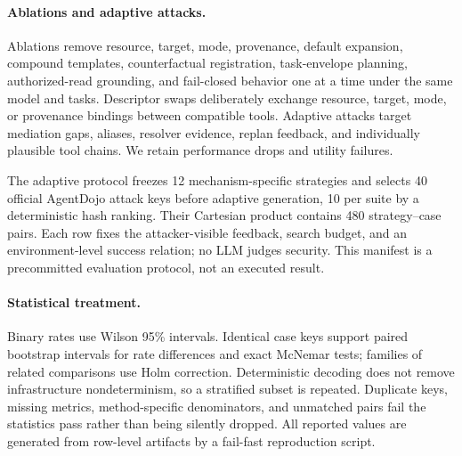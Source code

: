 \paragraph{Ablations and adaptive attacks.}
Ablations remove resource, target, mode, provenance, default expansion, compound templates, counterfactual registration, task-envelope planning, authorized-read grounding, and fail-closed behavior one at a time under the same model and tasks. Descriptor swaps deliberately exchange resource, target, mode, or provenance bindings between compatible tools. Adaptive attacks target mediation gaps, aliases, resolver evidence, replan feedback, and individually plausible tool chains. We retain performance drops and utility failures.

The adaptive protocol freezes 12 mechanism-specific strategies and selects 40 official AgentDojo attack keys before adaptive generation, 10 per suite by a deterministic hash ranking. Their Cartesian product contains 480 strategy--case pairs. Each row fixes the attacker-visible feedback, search budget, and an environment-level success relation; no LLM judges security. This manifest is a precommitted evaluation protocol, not an executed result.

\paragraph{Statistical treatment.}
Binary rates use Wilson 95\% intervals. Identical case keys support paired bootstrap intervals for rate differences and exact McNemar tests; families of related comparisons use Holm correction. Deterministic decoding does not remove infrastructure nondeterminism, so a stratified subset is repeated. Duplicate keys, missing metrics, method-specific denominators, and unmatched pairs fail the statistics pass rather than being silently dropped. All reported values are generated from row-level artifacts by a fail-fast reproduction script.
